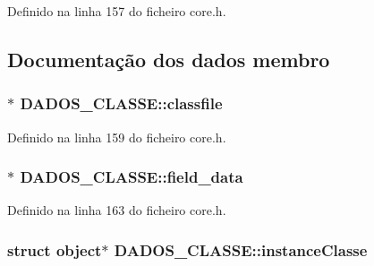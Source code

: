Definido na linha 157 do ficheiro core.\-h.



\subsection{Documentação dos dados membro}
\hypertarget{struct_d_a_d_o_s___c_l_a_s_s_e_a04a5c6ada8a199cc0f66130e8f3fd0db}{
\subsubsection[{classfile}]{$\ast$ D\-A\-D\-O\-S\-\_\-\-C\-L\-A\-S\-S\-E\-::classfile}}\label{struct_d_a_d_o_s___c_l_a_s_s_e_a04a5c6ada8a199cc0f66130e8f3fd0db}


Definido na linha 159 do ficheiro core.\-h.

\hypertarget{struct_d_a_d_o_s___c_l_a_s_s_e_a6a524c5e2a3eda5b548ee3cf703c727d}{
\subsubsection[{field\-\_\-data}]{$\ast$ D\-A\-D\-O\-S\-\_\-\-C\-L\-A\-S\-S\-E\-::field\-\_\-data}}\label{struct_d_a_d_o_s___c_l_a_s_s_e_a6a524c5e2a3eda5b548ee3cf703c727d}


Definido na linha 163 do ficheiro core.\-h.

\hypertarget{struct_d_a_d_o_s___c_l_a_s_s_e_a3e8be397f59bd8130a2d3df976af3830}{
\subsubsection[{instance\-Classe}]{\setlength{\rightskip}{0pt plus 5cm}struct {\bf object}$\ast$ D\-A\-D\-O\-S\-\_\-\-C\-L\-A\-S\-S\-E\-::instance\-Classe}}\label{struct_d_a_d_o_s___c_l_a_s_s_e_a3e8be397f59bd8130a2d3df976af3830}


